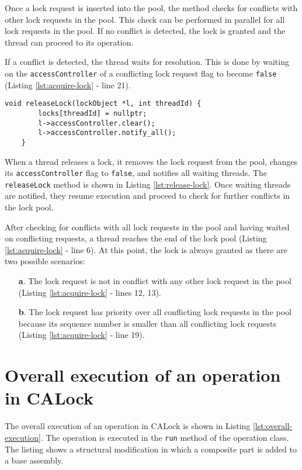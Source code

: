 Once a lock request is inserted into the pool, the method checks for conflicts with other lock requests in the pool. This check can be performed in parallel for all lock requests in the pool. If no conflict is detected, the lock is granted and the thread can proceed to its operation.

If a conflict is detected, the thread waits for resolution. This is done by waiting on the \texttt{accessController} of a conflicting lock request flag to become \texttt{false} (Listing \ref{lst:acquire-lock} - line 21).  

\begin{lstlisting}[caption={Releasing a lock}, label={lst:release-lock}]
    void releaseLock(lockObject *l, int threadId) {
        locks[threadId] = nullptr;
        l->accessController.clear();
        l->accessController.notify_all();
    }
\end{lstlisting}

When a thread releases a lock, it removes the lock request from the pool, changes its \texttt{accessController} flag to \texttt{false}, and notifies all waiting threads. The \texttt{releaseLock} method is shown in Listing \ref{lst:release-lock}. Once waiting threads are notified, they resume execution and proceed to check for further conflicts in the lock pool.


After checking for conflicts with all lock requests in the pool and having waited on conflicting requests, a thread reaches the end of the lock pool (Listing \ref{lst:acquire-lock} - line 6). At this point, the lock is always granted as there are two possible scenarios:

\begin{enumerate}
    \item[\textbf{a}.] The lock request is not in conflict with any other lock request in the pool (Listing \ref{lst:acquire-lock} - lines 12, 13).
    \item[\textbf{b}.] The lock request has priority over all conflicting lock requests in the pool because its sequence number is smaller than all conflicting lock requests (Listing \ref{lst:acquire-lock} - line 19). 
\end{enumerate}



\section{Overall execution of an operation in CALock}

The overall execution of an operation in CALock is shown in Listing \ref{lst:overall-execution}. The operation is executed in the \texttt{run} method of the operation class. The listing shows a structural modification in which a composite part is added to a base assembly.

